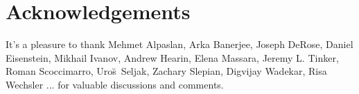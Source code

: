 \documentclass[12pt, letterpaper, preprint]{aastex63}
\begin{document}
 





 

\section*{Acknowledgements}
It's a pleasure to thank 
    Mehmet Alpaslan, 
    Arka Banerjee, 
    Joseph DeRose, 
    Daniel Eisenstein, 
    Mikhail Ivanov, 
    Andrew Hearin,
    Elena Massara,
    Jeremy L. Tinker,
    Roman Scoccimarro, 
    Uro{\u s}~Seljak,
    Zachary Slepian, 
    Digvijay Wadekar,
    Risa Wechsler
    ...
for valuable discussions and comments. 



 
\end{document}
